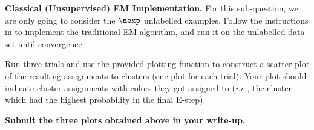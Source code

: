 \item{} \textbf{Classical (Unsupervised) EM Implementation.}
For this sub-question, we are only going to consider the $\nexp$ unlabelled examples. Follow the instructions in  to implement the traditional EM algorithm, and run it on the unlabelled data-set until convergence.

Run three trials and use the provided plotting function to construct a scatter plot of the resulting assignments to clusters (one plot for each trial). Your plot should indicate cluster assignments with colors they got assigned to (\emph{i.e.,} the cluster which had the highest probability in the final E-step).

\textbf{Submit the three plots obtained above in your write-up.}

